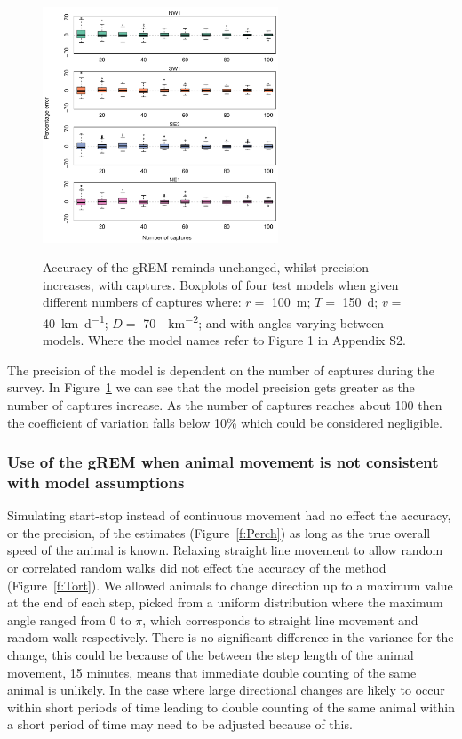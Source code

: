 \documentclass[a4paper,10pt,reqno,oneside]{amsart}
\begin{document}
\begin{figure}[t]
       \centering
	\includegraphics[width=7cm]{imgs/ResultsNoCaptures.pdf}
           \label{f:Captures}
        \caption{Accuracy of the gREM reminds unchanged, whilst precision increases, with captures. Boxplots of four test models when given different numbers of captures where: $r = $ \SI{100}{\meter}; $T = $ \SI{150}{\day}; $v = $ \SI{40}{\kilo\meter\per\day}; $D = $ \SI{70}{\animals\per\kilo\meter\squared}; and with angles varying between models. Where the model names refer to Figure 1 in Appendix S2.} 
\end{figure}

The precision of the model is dependent on the number of captures during the survey. In Figure~\ref{f:Captures} we can see that the model precision gets greater as the number of captures increase. As the number of captures reaches about 100 then the coefficient of variation falls below 10\% which could be considered negligible. %

\subsubsection{Use of the gREM when animal movement is not consistent with model assumptions}

 Simulating start-stop instead of continuous movement had no effect the accuracy, or the precision, of the estimates (Figure~\ref{f:Perch}) as long as the true overall speed of the animal is known. Relaxing straight line movement to allow random or correlated random walks did not effect the accuracy of the method (Figure~\ref{f:Tort}). We allowed animals to change direction up to a maximum value at the end of each step, picked from a uniform distribution where the maximum angle ranged from 0 to $\pi$, which corresponds to straight line movement and random walk respectively. There is no significant difference in the variance for the change, this could be because of the between the step length of the animal movement, 15 minutes, means that immediate double counting of the same animal is unlikely.  In the case where large directional changes are likely to occur within short periods of time leading to double counting of the same animal within a short period of time may need to be adjusted because of this. 
\end{document}
